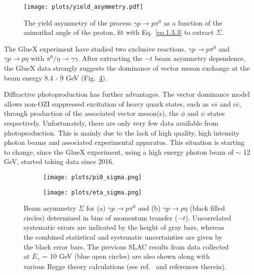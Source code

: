 \begin{figure}[H]
    \centering
        \texttt{[image: plots/yield\_asymmetry.pdf]}
        \caption{The yield asymmetry of the process $\gamma p \rightarrow p \pi^{0}$ as a function of the azimuthal angle of the proton, fit with Eq.~\ref{eq.1.3.3} to extract $\Sigma$.}
    \label{fig.1.3.3.2}
\end{figure}

The GlueX experiment have studied two exclusive reactions, $\gamma p \rightarrow p \pi^{0}$ and $\gamma p \rightarrow p \eta$ with $\pi^{0}/\eta\rightarrow \gamma\gamma$. After extracting the $-t$ beam asymmetry dependence, the GlueX data strongly suggests the dominance of vector meson exchange at the beam energy 8.4 - 9 GeV (Fig.~\ref{fig.1.3.3.3}).
~\par Diffractive photoproduction has further advantages. The vector dominance model allows non-OZI suppressed excitation of heavy quark states, such as $s\bar{s}$ and $c\bar{c}$, through production of the associated vector meson(s), the $\phi$ and $\psi$ states respectively. Unfortunately, there are only very few data available from photoproduction. This is mainly due to the lack of high quality, high intensity photon beams and associated experimental apparatus. This situation is starting to change, since the GlueX experiment, using a high energy photon beam of $\sim$ 12 GeV, started taking data since 2016.

\begin{figure}[H]
    \centering
    \begin{subfigure}[b]{0.65\textwidth}
        \texttt{[image: plots/pi0\_sigma.png]}
        \caption{}
        \label{fig.1.3.3.3.a}
    \end{subfigure}\hfill
    \begin{subfigure}[b]{0.65\textwidth}
        \texttt{[image: plots/eta\_sigma.png]}
        \caption{}
        \label{fig.1.3.3.3.b}
    \end{subfigure}
    \caption{ Beam asymmetry $\Sigma$ for (a) $\gamma p \rightarrow p \pi^{0}$ and (b) $\gamma p \rightarrow p \eta$ (black filled circles) determined in bins of momentum transfer ($-t$). Uncorrelated systematic errors are indicated by the height of gray bars, whereas the combined statistical and systematic uncertainties are given by the black error bars. The previous SLAC results from data collected at $\overline{{E}}_{\gamma}$ = 10 GeV (blue open circles) are also shown along with various Regge theory calculations (see ref.~\cite{Ghoul17} and references therein).}
    \label{fig.1.3.3.3}
\end{figure}

